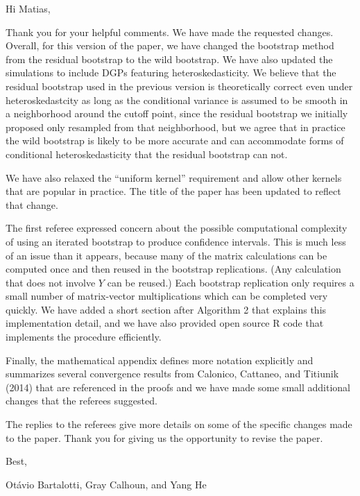 \documentclass[12pt,fleqn]{article}
\begin{document}
\noindent%
Hi Matias,

Thank you for your helpful comments. We have made the requested changes. Overall,
for this version of the paper, we have changed the bootstrap method from the
residual bootstrap to the wild bootstrap. We have also updated the simulations
to include DGPs featuring heteroskedasticity. We believe that the residual
bootstrap used in the previous version is theoretically correct even under
heteroskedastcity as long as the conditional variance is assumed to be smooth in
a neighborhood around the cutoff point, since the residual bootstrap we initially
proposed only resampled from that neighborhood, but we agree that in practice
the wild bootstrap is likely to be more accurate and can accommodate forms of
conditional heteroskedasticity that the residual bootstrap can not.

We have also relaxed the ``uniform kernel'' requirement and allow other kernels
that are popular in practice. The title of the paper has been updated to reflect
that change.

The first referee expressed concern about the possible computational complexity of
using an iterated bootstrap to produce confidence intervals. This is much less
of an issue than it appears, because many of the matrix calculations can be
computed once and then reused in the bootstrap replications. (Any calculation
that does not involve $Y$ can be reused.) Each bootstrap replication only
requires a small number of matrix-vector multiplications which can be completed
very quickly. We have added a short section after Algorithm 2 that explains
this implementation detail, and we have also provided open source R code that
implements the procedure efficiently.

Finally, the mathematical appendix defines more notation explicitly and
summarizes several convergence results from Calonico, Cattaneo, and Titiunik
(2014) that are referenced in the proofs and we have made some small additional
changes that the referees suggested.

The replies to the referees give more details on some of the specific
changes made to the paper. Thank you for giving us the opportunity to revise
the paper.

\noindent%
Best,

\noindent%
Ot\'avio Bartalotti, Gray Calhoun, and Yang He
\end{document}
